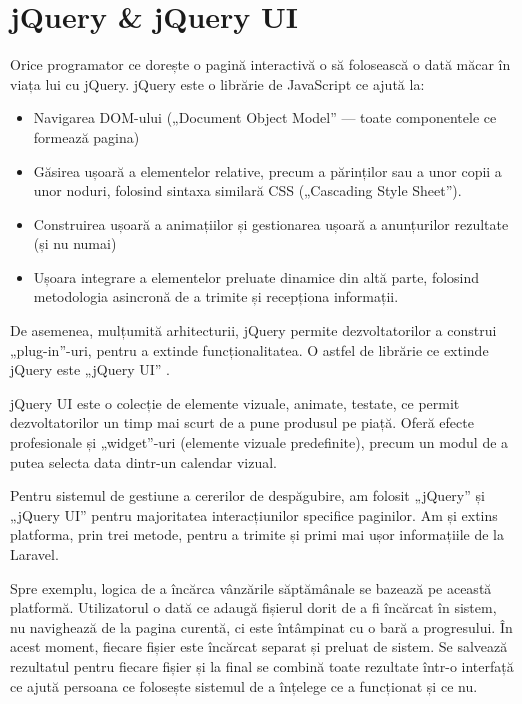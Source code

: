\section{jQuery \& jQuery UI}

	Orice programator ce dorește o pagină interactivă o să folosească o dată măcar în viața lui cu jQuery.
	jQuery este o librărie de JavaScript ce ajută la: \cite{jquery}
	\begin{itemize}
		\item Navigarea DOM-ului („Document Object Model” --- toate componentele ce formează pagina)
		\item Găsirea ușoară a elementelor relative, precum a părinților sau a unor copii a unor noduri, folosind sintaxa similară CSS („Cascading Style Sheet”).
		\item Construirea ușoară a animațiilor și gestionarea ușoară a anunțurilor rezultate (și nu numai)
		\item Ușoara integrare a elementelor preluate dinamice din altă parte, folosind metodologia asincronă de a trimite și recepționa informații.
	\end{itemize}

	De asemenea, mulțumită arhitecturii, jQuery permite dezvoltatorilor a construi „plug-in”-uri, pentru a extinde funcționalitatea.
	O astfel de librărie ce extinde jQuery este „jQuery UI” \cite{jquery_ui}.

	jQuery UI este o colecție de elemente vizuale, animate, testate, ce permit dezvoltatorilor un timp mai scurt de a pune produsul pe piață.
	Oferă efecte profesionale și „widget”-uri (elemente vizuale predefinite), precum un modul de a putea selecta data dintr-un calendar vizual.

	Pentru sistemul de gestiune a cererilor de despăgubire, am folosit „jQuery” și „jQuery UI” pentru majoritatea interacțiunilor specifice paginilor.
	Am și extins platforma, prin trei metode, pentru a trimite și primi mai ușor informațiile de la Laravel.

	Spre exemplu, logica de a încărca vânzările săptămânale se bazează pe această platformă.
	Utilizatorul o dată ce adaugă fișierul dorit de a fi încărcat în sistem, nu navighează de la pagina curentă, ci este întâmpinat cu o bară a progresului.
	În acest moment, fiecare fișier este încărcat separat și preluat de sistem.
	Se salvează rezultatul pentru fiecare fișier și la final se combină toate rezultate într-o interfață ce ajută persoana ce folosește sistemul de a înțelege ce a funcționat și ce nu.

